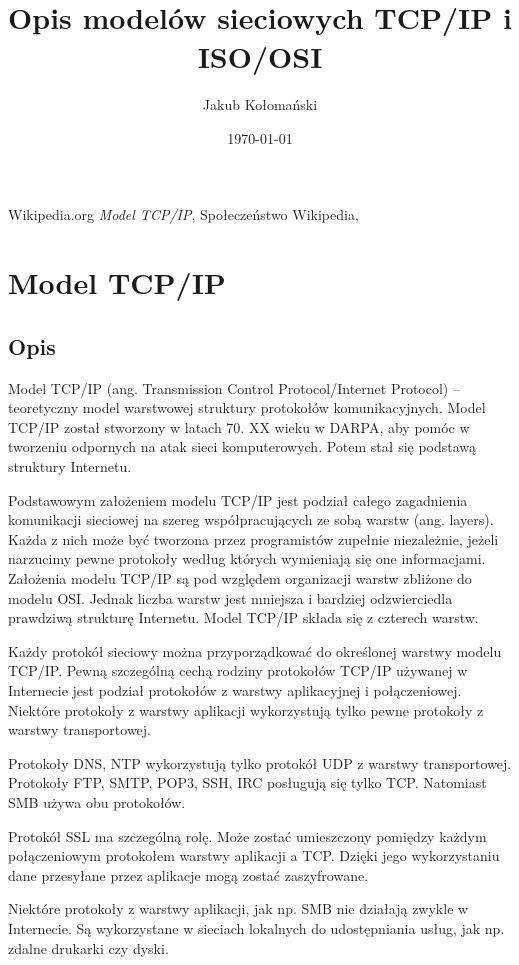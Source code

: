 \documentclass{article}
\title{Opis modelów sieciowych TCP/IP i ISO/OSI}
\date{\today}
\author{Jakub Kołomański}
\begin{document}
   \maketitle
  \begin{thebibliography}{9}
  Wikipedia.org
  \textit{Model TCP/IP},
  Społeczeństwo Wikipedia,
  
  \end{thebibliography}
  \newpage
 \section{Model TCP/IP}
\subsection{Opis}
	Model TCP/IP (ang. Transmission Control Protocol/Internet Protocol) – teoretyczny model warstwowej struktury protokołów komunikacyjnych. Model TCP/IP został stworzony w latach 70. XX wieku w DARPA, aby pomóc w tworzeniu odpornych na atak sieci komputerowych. Potem stał się podstawą struktury Internetu.
	
Podstawowym założeniem modelu TCP/IP jest podział całego zagadnienia komunikacji sieciowej na szereg współpracujących ze sobą warstw (ang. layers). Każda z nich może być tworzona przez programistów zupełnie niezależnie, jeżeli narzucimy pewne protokoły według których wymieniają się one informacjami. Założenia modelu TCP/IP są pod względem organizacji warstw zbliżone do modelu OSI. Jednak liczba warstw jest mniejsza i bardziej odzwierciedla prawdziwą strukturę Internetu. Model TCP/IP składa się z czterech warstw.

Każdy protokół sieciowy można przyporządkować do określonej warstwy modelu TCP/IP. Pewną szczególną cechą rodziny protokołów TCP/IP używanej w Internecie jest podział protokołów z warstwy aplikacyjnej i połączeniowej. Niektóre protokoły z warstwy aplikacji wykorzystują tylko pewne protokoły z warstwy transportowej.

Protokoły DNS, NTP wykorzystują tylko protokół UDP z warstwy transportowej. Protokoły FTP, SMTP, POP3, SSH, IRC posługują się tylko TCP. Natomiast SMB używa obu protokołów.

Protokół SSL ma szczególną rolę. Może zostać umieszczony pomiędzy każdym połączeniowym protokołem warstwy aplikacji a TCP. Dzięki jego wykorzystaniu dane przesyłane przez aplikacje mogą zostać zaszyfrowane.

Niektóre protokoły z warstwy aplikacji, jak np. SMB nie działają zwykle w Internecie. Są wykorzystane w sieciach lokalnych do udostępniania usług, jak np. zdalne drukarki czy dyski.
\end{document}

